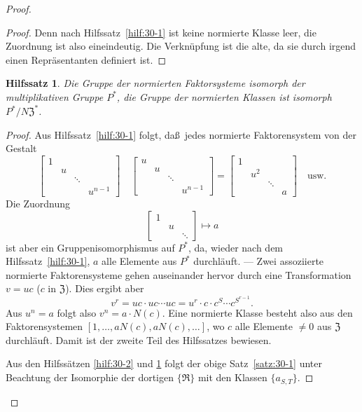 \documentclass[12pt,a4paper]{article}
\theoremstyle{plain}
\newtheorem{hilfssatz}{Hilfssatz}[section]
\theoremstyle{definition}
\theoremstyle{remark}
\begin{document}
\begin{proof}
\begin{proof}
Denn nach Hilfssatz~\ref{hilf:30-1} ist keine normierte Klasse leer,
die Zuordnung ist also eineindeutig. Die Verkn\"upfung ist die alte,
da sie durch irgend einen Repr\"asentanten definiert ist.
\end{proof}

\begin{hilfssatz}\label{hilf:30-3}
Die Gruppe der normierten Faktorsysteme isomorph der
multiplikativen Gruppe $P^{*}$, die Gruppe der normierten Klassen
ist isomorph $P^{*}/N\mathfrak{Z}^{*}$.
\end{hilfssatz}

\begin{proof}
Aus Hilfssatz~\ref{hilf:30-1} folgt, da\ss\ jedes normierte
Faktorensystem von der Gestalt
\[
\begin{bmatrix}
1 & & & \\
& u & & \\
& & \ddots & \\
& & & u^{n-1}
\end{bmatrix}
\quad
\begin{bmatrix}
u & & & \\
& u & & \\
& & \ddots & \\
& & & u^{n-1}
\end{bmatrix}
= \begin{bmatrix}
1 & & & \\
& u^{2} & & \\
& & \ddots & \\
& & & a
\end{bmatrix}
\quad \text{usw.}
\]
Die Zuordnung
\[
\begin{bmatrix}
1 & & \\
& u & \\
& & \ddots
\end{bmatrix}
\mapsto a
\]
ist aber ein Gruppenisomorphismus auf $P^{*}$, da, wieder nach dem
Hilfssatz~\ref{hilf:30-1}, $a$ alle Elemente aus $P^{*}$ durchl\"auft.
--- Zwei assoziierte normierte Faktorensysteme gehen auseinander
hervor durch eine Transformation $v = uc$ ($c$ in $\mathfrak{Z}$). Dies
ergibt aber
\[
v^{r} = uc \cdot uc \cdots uc = u^{r} \cdot c \cdot c^{S} \cdots c^{S^{r-1}}.
\]
Aus $u^{n} = a$ folgt also $v^{n} = a \cdot N(c)$. Eine normierte Klasse
besteht also aus den Faktorensystemen
$[1, \ldots, aN(c), aN(c), \ldots]$, wo $c$ alle Elemente $\neq 0$ aus
$\mathfrak{Z}$ durchl\"auft. Damit ist der zweite Teil des Hilfssatzes
bewiesen.

Aus den Hilfss\"atzen \ref{hilf:30-2} und \ref{hilf:30-3} folgt der obige
Satz~\ref{satz:30-1} unter Beachtung der Isomorphie der dortigen
$\{\mathfrak{R}\}$ mit den Klassen $\{a_{S,T}\}$.
\end{proof}
\end{proof}
\end{document}
